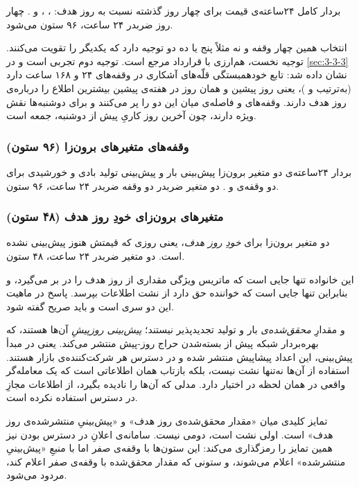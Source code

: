 بردار کامل ۲۴ساعته‌ی قیمت برای چهار روز گذشته نسبت به روز هدف: ، ،
 و . چهار روز ضربدر ۲۴ ساعت، ۹۶ ستون می‌شود.

انتخاب همین چهار وقفه  و نه مثلاً پنج یا ده  دو توجیه دارد که یکدیگر را
تقویت می‌کنند. توجیه نخست، هم‌ارزی با قرارداد مرجع است. توجیه دوم تجربی است و در \cref{sec:3-3-3} نشان داده شد: تابع خودهمبستگی قلّه‌های آشکاری در وقفه‌های ۲۴ و ۱۶۸ ساعت دارد
(به‌ترتیب  و )، یعنی روز پیشین و همان روز در هفته‌ی پیشین
بیشترین اطلاع را درباره‌ی روز هدف دارند. وقفه‌های  و  فاصله‌ی میان این
دو را پر می‌کنند و برای دوشنبه‌ها نقش ویژه دارند، چون آخرین روز کاریِ پیش از دوشنبه،
جمعه است.

\subsubsection*{وقفه‌های متغیرهای برون‌زا (۹۶ ستون)}

بردار ۲۴ساعته‌ی دو متغیر برون‌زا  پیش‌بینی بار و پیش‌بینی تولید بادی و خورشیدی
 برای دو وقفه‌ی  و . دو متغیر ضربدر دو وقفه ضربدر ۲۴ ساعت، ۹۶
ستون.

\subsubsection*{متغیرهای برون‌زای خودِ روز هدف (۴۸ ستون)}

دو متغیر برون‌زا برای \emph{خودِ روز هدف}، یعنی روزی که قیمتش هنوز پیش‌بینی نشده
است. دو متغیر ضربدر ۲۴ ساعت، ۴۸ ستون.

این خانواده تنها جایی است که ماتریس ویژگی مقداری از روز هدف را در بر می‌گیرد، و
بنابراین تنها جایی است که خواننده حق دارد از نشت اطلاعات بپرسد. پاسخ در ماهیت این دو
سری است و باید صریح گفته شود.

 و  مقدارِ \emph{محقق‌شده‌ی} بار و تولید تجدیدپذیر نیستند؛
\emph{پیش‌بینی روزپیشِ} آن‌ها هستند، که بهره‌بردار شبکه پیش از بسته‌شدن حراج روز-پیش
منتشر می‌کند. یعنی در مبدأ پیش‌بینی، این اعداد پیشاپیش منتشر شده و در دسترس هر
شرکت‌کننده‌ی بازار هستند. استفاده از آن‌ها نه‌تنها نشت نیست، بلکه بازتاب همان
اطلاعاتی است که یک معامله‌گر واقعی در همان لحظه در اختیار دارد. مدلی که آن‌ها را
نادیده بگیرد، از اطلاعات مجازِ در دسترس استفاده نکرده است.

تمایز کلیدی میان «مقدار محقق‌شده‌ی روز هدف» و «پیش‌بینیِ منتشرشده‌ی روز هدف» است. اولی
نشت است، دومی نیست. سامانه‌ی اعلانِ در دسترس بودن نیز همین تمایز را رمزگذاری می‌کند:
این ستون‌ها با وقفه‌ی صفر اما با منبعِ «پیش‌بینیِ منتشرشده» اعلام می‌شوند، و ستونی که
مقدار محقق‌شده با وقفه‌ی صفر اعلام کند، مردود می‌شود.

